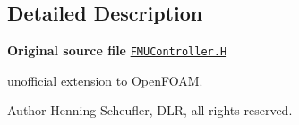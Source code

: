 \subsection{Detailed Description}
{\bfseries Original source file} \href{../../../home/carlo/data/GeN-Foam/GeN-Foam_ffn/GeN-Foam/GeN-Foam/FMU4FOAM/src/OF_FMU/FMU/FMUController.H}{\tt F\+M\+U\+Controller.\+H}

\begin{DoxyVerb}unofficial extension to OpenFOAM.
\end{DoxyVerb}


Author Henning Scheufler, D\+LR, all rights reserved. 